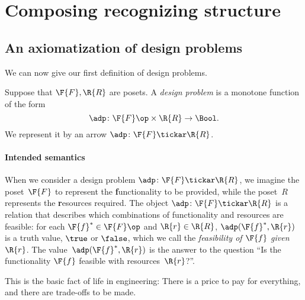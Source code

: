 \section{Composing recognizing structure}
\subsection{An axiomatization of design problems}
We can now give our first definition of design problems.

\begin{definition} \label{def:design-problem}
Suppose that $\F{F}, \R{R}$ are posets. A \emph{design problem} is a monotone function of the form
\begin{equation}
	\adp \colon  \F{F}\op \times \R{R} \to \Bool.
\end{equation}
We represent it by an arrow $\adp \colon \F{F} \tickar \R{R}$.
\end{definition}

\paragraph{Intended semantics}

When we consider a design problem $\adp\colon \F{F} \tickar \R{R}$, we imagine the poset~$\F{F}$ to represent the \textbf{f}unctionality to be provided, while the poset~$R$ represents the \textbf{r}esources required. The object $\adp \colon \F{F} \tickar \R{R}$ is a relation that describes which combinations of functionality and resources are feasible: for each $\F{f}^* \in \F{F}\op$ and $\R{r} \in \R{R}$, $\adp(\F{f}^*,\R{r})$ is a truth value, $\true$ or $\false$, which we call the \emph{feasibility of $\F{f}$ given $\R{r}$}. The value~$\adp(\F{f}^*,\R{r})$ is the answer to the question ``Is the functionality $\F{f}$ feasible with resources~$\R{r}$?''.

This is the basic fact of life in engineering: There is a price to pay for everything, and there are trade-offs to be made.


